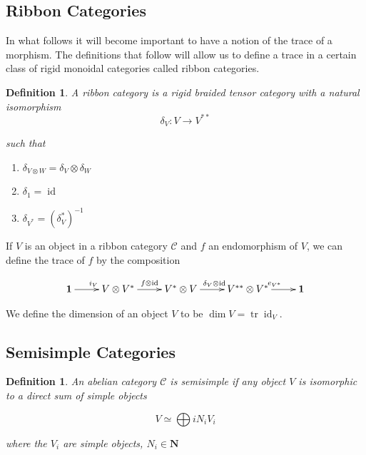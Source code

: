 \documentclass[]{article}
\newtheorem{defn}[theorem]{Definition}
\newcommand{\tr}{\operatorname{tr}}
\newcommand{\id}{\operatorname{id}}
\numberwithin{equation}{subsection}
\begin{document}
\subsection{Ribbon Categories}

In what follows it will become important to have a notion of the trace of a
morphism. The definitions that follow will allow us to define a trace in a
certain class of rigid monoidal categories called ribbon categories.

\begin{defn}

    A \emph{ribbon category} is a rigid braided tensor category with a natural isomorphism
    \begin{equation}
        \delta_V: V \to V^{**}
    \end{equation}

such that 
\begin{enumerate}
    \renewcommand{\labelenumi}{\roman{enumi})}

    \item $\delta_{V \otimes W} = \delta_V \otimes \delta_W$
    \item $\delta_1 = \id$
    \item $\delta_{V^*} = (\delta_V^*)^{-1}$
\end{enumerate}

\end{defn}

If $V$ is an object in a ribbon category $\mathcal{C}$ and $f$ an endomorphism of $V$, we can define the trace of $f$ by the composition

\begin{equation}
    \xymatrix{
    \mathbf{1} \ar[r]^{i_V} & V \otimes V^* \ar[r]^{f \otimes \id} & V^* \otimes V \ar[r]^{\delta_V \otimes \id} & V^{**} \otimes V^* \ar[r]^{e_{V^*}} & 
    \mathbf{1}
    }
\end{equation}

We define the dimension of an object $V$ to be $\dim V = \tr \id_V$.

\subsection{Semisimple Categories}
\begin{defn}
    An abelian category $\mathcal{C}$ is \emph{semisimple} if any object $V$ is isomorphic to a direct sum of simple objects

    \begin{equation}
        V \simeq \bigoplus{i} N_i V_i
    \end{equation}

    where the $V_i$ are simple objects, $N_i \in \mathbf{N}$

\end{defn}
\end{document}
